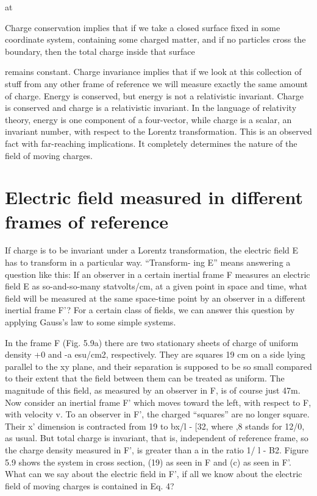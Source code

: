 at

Charge conservation implies that if we take a closed surface fixed in
some coordinate system, containing some charged matter, and if no
particles cross the boundary, then the total charge inside that surface

remains constant. Charge invariance implies that if we look at this
collection of stuff from any other frame of reference we will measure
exactly the same amount of charge. Energy is conserved, but energy
is not a relativistic invariant. Charge is conserved and charge is a
relativistic invariant. In the language of relativity theory, energy is
one component of a four-vector, while charge is a scalar, an invariant
number, with respect to the Lorentz transformation. This is an observed
fact with far-reaching implications. It completely determines
the nature of the field of moving charges.

\section{Electric field measured in different frames of reference}

If charge is to be invariant under a Lorentz transformation, the
electric field E has to transform in a particular way. ``Transform-
ing E'' means answering a question like this: If an observer in a certain
inertial frame F measures an electric field E as so-and-so-many
statvolts/cm, at a given point in space and time, what field will be
measured at the same space-time point by an observer in a different
inertial frame F'? For a certain class of fields, we can answer this
question by applying Gauss's law to some simple systems.

In the frame F (Fig. 5.9a) there are two stationary sheets of charge
of uniform density +0 and -a esu/cm2, respectively. They are
squares 19 cm on a side lying parallel to the xy plane, and their separation
is supposed to be so small compared to their extent that the field
between them can be treated as uniform. The magnitude of this
field, as measured by an observer in F, is of course just 47m. Now
consider an inertial frame F' which moves toward the left, with
respect to F, with velocity v. To an observer in F', the charged
``squares'' are no longer square. Their x' dimension is contracted
from 19 to bx/l - [32, where ,8 stands for 12/0, as usual. But total
charge is invariant, that is, independent of reference frame, so the
charge density measured in F', is greater than a in the ratio 1/ \/l - B2.
Figure 5.9 shows the system in cross section, (19) as seen in F and (c)
as seen in F'. What can we say about the electric field in F', if all
we know about the electric field of moving charges is contained in
Eq. 4?


